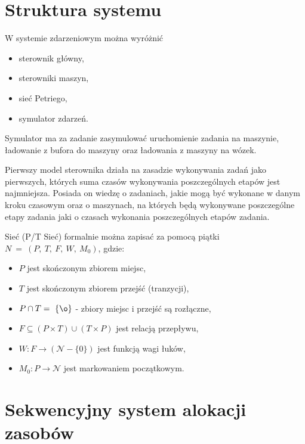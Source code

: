 \documentclass[10pt, a4paper]{article}
\begin{document}
\section{Struktura systemu}

W systemie zdarzeniowym można wyróżnić
\begin{itemize}
\item sterownik główny,
\item sterowniki maszyn,
\item sieć Petriego,
\item symulator zdarzeń.
\end{itemize}

Symulator ma za zadanie zasymulować uruchomienie zadania na maszynie, ładowanie z bufora do maszyny oraz ładowania z maszyny na wózek.

Pierwszy model sterownika działa na zasadzie wykonywania zadań jako pierwszych, których suma czasów wykonywania poszczególnych etapów jest najmniejsza. Posiada on wiedzę o zadaniach, jakie mogą być wykonane w danym kroku czasowym oraz o maszynach, na których będą wykonywane poszczególne etapy zadania jaki o czasach wykonania poszczególnych etapów zadania.


Sieć (P/T Sieć) formalnie można zapisać za pomocą piątki $N\ =\ (P,\ T,\ F,\ W,\ M_0)$, gdzie:
\begin{itemize}
\item $P$ jest skończonym zbiorem miejsc,
\item $T$ jest skończonym zbiorem przejść (tranzycji),
\item $P \cap T =\ \{\o \}$ - zbiory miejsc i przejść są rozłączne,
\item $F \subseteq (P\times T)\cup (T\times P)$ jest relacją przepływu,
\item $W:F\to (\mathcal{N}-\{0\})$ jest funkcją wagi łuków,
\item $M_0:P  \to \mathcal{N}$ jest markowaniem początkowym.
\end{itemize}
\section{Sekwencyjny system alokacji zasobów}
\end{document}
